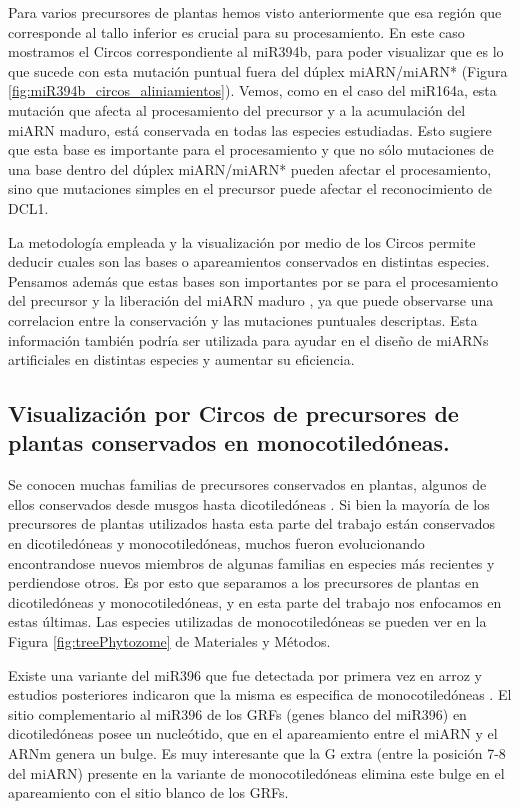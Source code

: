 Para varios precursores de plantas hemos visto anteriormente que esa región que corresponde al tallo inferior es crucial para su procesamiento.
En este caso mostramos el Circos correspondiente al miR394b, para poder visualizar que es lo que sucede con esta mutación puntual fuera del dúplex miARN/miARN* (Figura \ref{fig:miR394b_circos_aliniamientos}).
Vemos, como en el caso del miR164a, esta mutación que afecta al procesamiento del precursor y a la acumulación del miARN maduro, está conservada en todas las especies estudiadas.
Esto sugiere que esta base es importante para el procesamiento y que no sólo mutaciones de una base dentro del dúplex miARN/miARN* pueden afectar el procesamiento, sino que mutaciones simples en el precursor puede afectar el reconocimiento de DCL1. 


La metodología empleada y la visualización por medio de los Circos permite deducir cuales son las bases o apareamientos conservados en distintas especies.
Pensamos además que estas bases son importantes por se para el procesamiento del precursor y la liberación del miARN maduro , ya que puede observarse una correlacion entre la conservación y las mutaciones puntuales descriptas.
Esta información también podría ser utilizada para ayudar en el diseño de miARNs artificiales en distintas especies y aumentar su eficiencia.

\subsection{Visualización por Circos de precursores de plantas conservados en monocotiledóneas.}

Se conocen muchas familias de precursores conservados en plantas, algunos de ellos conservados desde musgos hasta dicotiledóneas \citep{pmid15849273,Axtell2008343,citeulike:8816489}.
Si bien la mayoría de los precursores de plantas utilizados hasta esta parte del trabajo están conservados en dicotiledóneas y monocotiledóneas, muchos fueron evolucionando encontrandose nuevos miembros de algunas familias en especies más recientes y perdiendose otros.    
Es por esto que separamos a los precursores de plantas en dicotiledóneas y monocotiledóneas, y en esta parte del trabajo nos enfocamos en estas últimas.
Las especies utilizadas de monocotiledóneas se pueden ver en la Figura \ref{fig:treePhytozome} de Materiales y Métodos.

Existe una variante del miR396 que fue detectada por primera vez en arroz \citep{pmid15805478} y estudios posteriores indicaron que la misma es especifica de monocotiledóneas \citep{pmid18416839, pmid19936050}.
El sitio complementario al miR396 de los GRFs (genes blanco del miR396) en dicotiledóneas posee un nucleótido, que en el apareamiento entre el miARN y el ARNm genera un bulge.
Es muy interesante que la G extra (entre la posición 7-8 del miARN) presente en la variante de monocotiledóneas elimina este bulge en el apareamiento con el sitio blanco de los GRFs.

